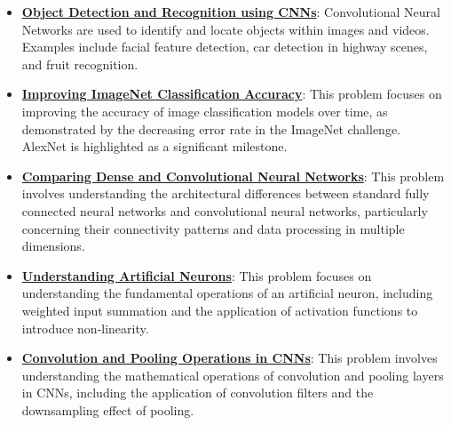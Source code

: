 \documentclass{article}%
\begin{document}
\begin{itemize}[leftmargin=*]
\item \href{https://purdue.brightspace.com/d2l/common/assets/pdfjs-d2l-dist/1.0.14-legacy/web/viewer.html?file=\%2Fcontent\%2Fenforced\%2F1095467-wl.202510.CS.24300.001\%2F09L1-cnn.pdf\%3Fou\%3D1095467\&lang=en-us\&container=d2l-fileviewer-rendered-pdf\&fullscreen=d2l-fileviewer-rendered-pdf-dialog\&height=667#page=2}{\textbf{Object Detection and Recognition using CNNs}}: Convolutional Neural Networks are used to identify and locate objects within images and videos. Examples include facial feature detection, car detection in highway scenes, and fruit recognition.%
\item \href{https://purdue.brightspace.com/d2l/common/assets/pdfjs-d2l-dist/1.0.14-legacy/web/viewer.html?file=\%2Fcontent\%2Fenforced\%2F1095467-wl.202510.CS.24300.001\%2F09L1-cnn.pdf\%3Fou\%3D1095467\&lang=en-us\&container=d2l-fileviewer-rendered-pdf\&fullscreen=d2l-fileviewer-rendered-pdf-dialog\&height=667#page=3}{\textbf{Improving ImageNet Classification Accuracy}}: This problem focuses on improving the accuracy of image classification models over time, as demonstrated by the decreasing error rate in the ImageNet challenge. AlexNet is highlighted as a significant milestone.%
\item \href{https://purdue.brightspace.com/d2l/common/assets/pdfjs-d2l-dist/1.0.14-legacy/web/viewer.html?file=\%2Fcontent\%2Fenforced\%2F1095467-wl.202510.CS.24300.001\%2F09L1-cnn.pdf\%3Fou\%3D1095467\&lang=en-us\&container=d2l-fileviewer-rendered-pdf\&fullscreen=d2l-fileviewer-rendered-pdf-dialog\&height=667#page=4}{\textbf{Comparing Dense and Convolutional Neural Networks}}: This problem involves understanding the architectural differences between standard fully connected neural networks and convolutional neural networks, particularly concerning their connectivity patterns and data processing in multiple dimensions.%
\item \href{https://purdue.brightspace.com/d2l/common/assets/pdfjs-d2l-dist/1.0.14-legacy/web/viewer.html?file=\%2Fcontent\%2Fenforced\%2F1095467-wl.202510.CS.24300.001\%2F09L1-cnn.pdf\%3Fou\%3D1095467\&lang=en-us\&container=d2l-fileviewer-rendered-pdf\&fullscreen=d2l-fileviewer-rendered-pdf-dialog\&height=667#page=5}{\textbf{Understanding Artificial Neurons}}: This problem focuses on understanding the fundamental operations of an artificial neuron, including weighted input summation and the application of activation functions to introduce non-linearity.%
\item \href{https://purdue.brightspace.com/d2l/common/assets/pdfjs-d2l-dist/1.0.14-legacy/web/viewer.html?file=\%2Fcontent\%2Fenforced\%2F1095467-wl.202510.CS.24300.001\%2F09L1-cnn.pdf\%3Fou\%3D1095467\&lang=en-us\&container=d2l-fileviewer-rendered-pdf\&fullscreen=d2l-fileviewer-rendered-pdf-dialog\&height=667#page=6}{\textbf{Convolution and Pooling Operations in CNNs}}: This problem involves understanding the mathematical operations of convolution and pooling layers in CNNs, including the application of convolution filters and the downsampling effect of pooling.%

\end{itemize}
\end{document}
